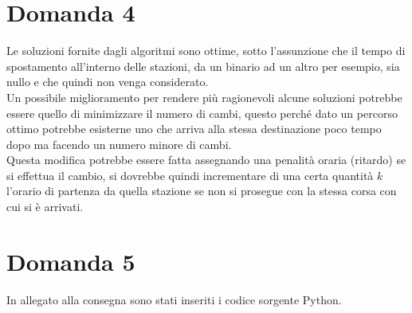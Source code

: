 \documentclass{article}
\begin{document}
\section*{Domanda 4}
Le soluzioni fornite dagli algoritmi sono ottime, sotto l'assunzione che il tempo di spostamento all'interno delle stazioni, da un binario ad un altro per esempio, sia nullo e che quindi non venga considerato.\\
Un possibile miglioramento per rendere più ragionevoli alcune soluzioni potrebbe essere quello di minimizzare il numero di cambi, questo perché dato un percorso ottimo potrebbe esisterne uno che arriva alla stessa destinazione poco tempo dopo ma facendo un numero minore di cambi.\\
Questa modifica potrebbe essere fatta assegnando una penalità oraria (ritardo) se si effettua il cambio, si dovrebbe quindi incrementare di una certa quantità $k$ l'orario di partenza da quella stazione se non si prosegue con la stessa corsa con cui si è arrivati.

\section*{Domanda 5}
In allegato alla consegna sono stati inseriti i codice sorgente Python.
\end{document}
